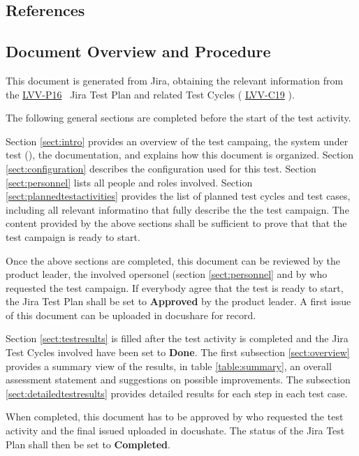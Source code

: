 \documentclass[DM,lsstdraft,STR,toc]{lsstdoc}
\begin{document}
\subsection{References}
\label{sect:references}
\renewcommand{\refname}{}


\subsection{Document Overview and Procedure}
\label{sect:docoverview}

This document is generated from Jira, obtaining the relevant information from the 
\href{https://jira.lsstcorp.org/secure/Tests.jspa#/testPlan/LVV-P16}{LVV-P16}
~Jira Test Plan and related Test Cycles (
\href{https://jira.lsstcorp.org/secure/Tests.jspa#/testCycle/LVV-C19}{LVV-C19}
).

The following general sections are completed before the start of the test activity.

Section \ref{sect:intro} provides an overview of the test campaing, the system under test (\product{}), the documentation, and explains how this document is organized.
Section \ref{sect:configuration}  describes the configuration used for this test.
Section \ref{sect:personnel} lists all people and roles involved.
Section \ref{sect:plannedtestactivities} provides the list of planned test cycles and test cases, including all relevant informatino that fully describe the the test campaign.
The content provided by the above sections shall be sufficient to prove that that the test campaign is ready to start.

Once the above sections are completed, this document can be reviewed by the product leader, the involved opersonel (section \ref{sect:personnel} and by who requested the test campaign.
If everybody agree that the test is ready to start, the Jira Test Plan shall be set to {\bf Approved} by the \product{} product leader.
A first issue of this document can be uploaded in docushare for record.

Section \ref{sect:testresults} is filled after the test activity is completed and the Jira Test Cycles involved have been set to {\bf Done}.
The first subsection \ref{sect:overview} provides a summary view of the results, in table \ref{table:summary}, 
an overall assessment statement and suggestions on possible improvements.
The subsection \ref{sect:detailedtestresults} provides detailed results for each step in each test case.

When completed, this document has to be approved by who requested the test activity and
the final issued uploaded in docushate. 
The status of the Jira Test Plan shall then be set to {\bf Completed}.
\end{document}
